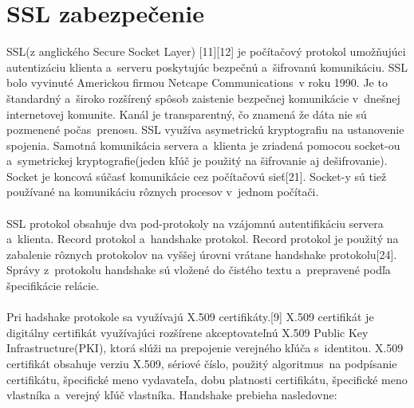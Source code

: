 \documentclass[
  printed, %
  notable,   %
  nolof,     %
    oneside,       %
  nolot,     %
]{fithesis3}
\begin{document}
\section{SSL zabezpečenie}
SSL(z anglického Secure Socket Layer) [11][12] je počítačový protokol umožňujúci autentizáciu  klienta a~serveru  poskytujúc  bezpečnú a~šifrovanú komunikáciu. SSL bolo vyvinuté Americkou firmou Netcape Communications~v roku 1990. Je to štandardný a~široko rozšírený spôsob zaistenie bezpečnej komunikácie v~dnešnej internetovej komunite. Kanál je transparentný, čo znamená že dáta nie sú pozmenené počas~prenosu. SSL využíva asymetrickú kryptografiu  na ustanovenie spojenia. Samotná komunikácia servera a~klienta je zriadená pomocou socket-ou a~symetrickej kryptografie(jeden kľúč je použitý na šifrovanie aj dešifrovanie). Socket je koncová súčasť komunikácie cez počítačovú sieť[21]. Socket-y sú tiež používané na komunikáciu rôznych procesov v~jednom počítači. \paragraph{}
SSL protokol obsahuje dva pod-protokoly na vzájomnú autentifikáciu servera a~klienta. Record protokol a~handshake protokol. Record protokol je použitý na zabalenie rôznych protokolov na vyššej úrovni vrátane handshake protokolu[24]. Správy z~protokolu handshake  sú vložené do čistého textu a~prepravené podľa špecifikácie relácie. \paragraph{}
Pri hadshake protokole sa využívajú X.509 certifikáty.[9] X.509 certifikát je digitálny certifikát využívajúci rozšírene akceptovateľnú X.509 Public Key Infrastructure(PKI), ktorá slúži na prepojenie verejného kľúča s~identitou.  X.509 certifikát obsahuje verziu X.509, sériové číslo, použitý algoritmus~na podpísanie certifikátu, špecifické meno vydavateľa, dobu platnosti certifikátu, špecifické meno vlastníka a~verejný kľúč vlastníka.  
Handshake prebieha nasledovne:
\end{document}
